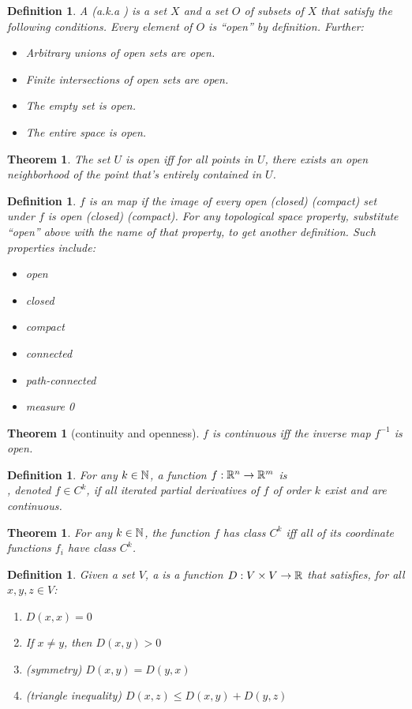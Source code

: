 \documentclass[11pt]{amsbook}
\theoremstyle{mystyle} \newtheorem{thrm}[thm]{Theorem}
\theoremstyle{mystyle} \newtheorem{defi}[thm]{Definition}
\theoremstyle{mystyle} \newtheorem{coro}[thm]{Corollary}
\theoremstyle{mystyle} \newtheorem{propo}[thm]{Proposition}
\theoremstyle{mystyle} \newtheorem{lemm}[thm]{Lemma}
\numberwithin{thm}{section}
\begin{document}
\begin{defi}
	A  (a.k.a ) is a set $X$ and a set $O$ of subsets of $X$ that satisfy the following conditions.  Every element of $O$ is ``open'' by definition.  Further:
	\begin{itemize}
		\item Arbitrary unions of open sets are open.
		\item Finite intersections of open sets are open.
		\item The empty set is open.
		\item The entire space is open.
	\end{itemize}
\end{defi}
\begin{thrm}
	The set $U$ is open iff for all points in $U$, there exists an open neighborhood of the point that's entirely contained in $U$.
\end{thrm}
\begin{defi}
	$f$ is an  map if the image of every open (closed) (compact) set under $f$ is open (closed) (compact).
	For any topological space property, substitute ``open'' above with the name of that property, to get another definition.  Such properties include:
	\begin{itemize}
		\item open
		\item closed
		\item compact
		\item connected
		\item path-connected
		\item measure 0
	\end{itemize}
\end{defi}
\begin{thrm}[continuity and openness]
	$f$ is continuous iff the inverse map $f^{-1}$ is open.
\end{thrm}
\begin{defi}
	For any $k \in {\mathbb N}$, a function $f:{\mathbb R}^n \to {\mathbb R}^m$ is \\, denoted $f \in C^k$, if all iterated partial derivatives of $f$ of order $k$ exist and are continuous.
\end{defi}
\begin{thrm}
	For any $k \in {\mathbb N}$, the function $f$ has class $C^k$ iff all of its coordinate functions $f_i$ have class $C^k$.
\end{thrm}
\begin{defi}
	Given a set $V$, a  is a function $D : V \times V \to {\mathbb R}$ that satisfies, for all $x, y, z \in V$:
	\begin{enumerate}
		\item $D(x,x) = 0$
		\item If $x \neq y$, then $D(x,y) > 0$
		\item (symmetry) $D(x,y) = D(y,x)$
		\item (triangle inequality) $D(x,z) \leq D(x,y) + D(y,z)$
	\end{enumerate}
\end{defi}
\end{document}
